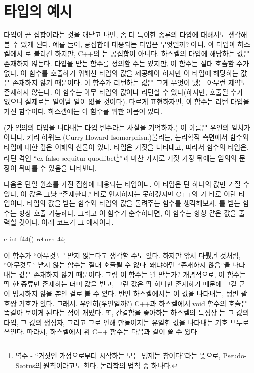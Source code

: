 \section{타입의 예시}

타입이 곧 집합이라는 것을 깨닫고 나면, 좀 더 특이한 종류의 타입에 대해서도 생각해 볼 수 있게 된다.
예를 들어, 공집합에 대응되는 타입은 무엇일까? 아니, 이 타입이 하스켈에서 로 불리긴 하지만, C++의 는 공집합이 아니다. 
하스켈의  타입에 해당하는 값은 존재하지 않는다.  타입을 받는 함수를 정의할 수는 있지만, 이 함수는 절대 호출할 수가 없다.
이 함수를 호출하기 위해선  타입의 값을 제공해야 하지만 이 타입에 해당하는 값은 존재하지 않기 때문이다. 
이 함수가 리턴하는 값은 그게 무엇이 됐든 아무런 제약도 존재하지 않는다. 이 함수는 아무 타입의 값이나 리턴할 수 있다(하지만, 호출될 수가 없으니 실제로는 일어날 일이 없을 것이다).
다르게 표현하자면, 이 함수는 \trPolymorphic 리턴 타입을 가진 함수이다. 하스켈에는 이 함수를 위한 이름이 있다.


(가 임의의 타입을 나타내는 타입 변수라는 사실을 기억하자.)
이 이름은 우연의 일치가 아니다. 커리-하워드 \trIsomorphism(Curry-Howard Isomorphism) 불리는, 논리학적 측면에서 함수와 타입에 대한 깊은 이해의 산물이 있다.
 타입은 거짓을 나타내고, 따라서  함수의 타입은, 라틴 격언 ``ex falso sequitur quodlibet\footnote{역주 - ``거짓인 가정으로부터 시작하는 모든 명제는 참이다''라는 뜻으로, Pseudo-Scotus의 원칙이라고도 한다. 논리학의 법칙 중 하나다.}''과 마찬 가지로 거짓 가정 뒤에는 임의의 문장이 뒤따를 수 있음을 나타낸다.

다음은 단일 원소를 가진 집합에 대응되는 타입이다. 이 타입은 단 하나의 값만 가질 수 있다. 이 값은 그냥 ``존재한다.''
바로 인지하지는 못하겠지만 C++의 가 바로 이런 타입이다.  타입의 값을 받는 함수와  타입의 값을 돌려주는 함수를 생각해보자.
를 받는 함수는 항상 호출 가능하다. 그리고 이 함수가 순수하다면, 이 함수는 항상 같은 값을 출력할 것이다. 아래 코드가 그 예시이다.

\begin{snip}{c}
int f44() { return 44; }
\end{snip}
이 함수가 ``아무것도'' 받지 않는다고 생각할 수도 있다. 하지만 앞서 다뤘던 것처럼, ``아무것도'' 받지 않는 함수는 절대 호출될 수 없다.
왜냐하면 ``존재하지 않음''을 나타내는 값은 존재하지 않기 때문이다. 그럼 이 함수는 뭘 받는가?
개념적으로, 이 함수는 딱 한 종류만 존재하는 더미 값을 받고, 그런 값은 딱 하나만 존재하기 때문에 그걸 굳이 명시하지 않을 뿐인 걸로 볼 수 있다.
반면 하스켈에서는 이 값을 나타내는, 텅빈 괄호쌍 \code{()} 기호가 있다.
그래서, 우연히(우연일까?) C++과 하스켈에서 void 함수의 호출은 똑같아 보이게 된다는 점이 재밌다.
또, 간결함을 좋아하는 하스켈의 특성상 \code{()}는 그 값의 타입, 그 값의 생성자, 그리고 그로 인해 만들어지는 유일한 값을 나타내는 기호 모두로 쓰인다.
따라서, 하스켈에서 위 C++ 함수는 다음과 같이 쓸 수 있다.

